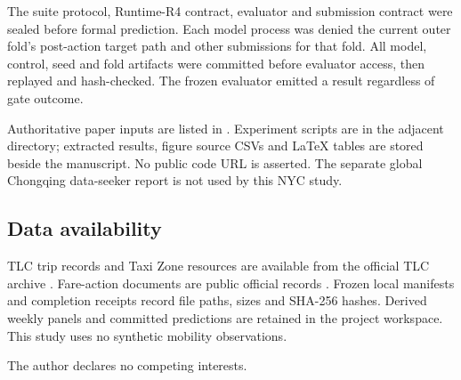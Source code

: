 \documentclass{nature}
\begin{document}
\begin{methods}
The suite protocol, Runtime-R4 contract, evaluator and submission contract were sealed before formal prediction. Each model process was denied the current outer fold's post-action target path and other submissions for that fold. All model, control, seed and fold artifacts were committed before evaluator access, then replayed and hash-checked. The frozen evaluator emitted a result regardless of gate outcome.

Authoritative paper inputs are listed in . Experiment scripts are in the adjacent  directory; extracted results, figure source CSVs and LaTeX tables are stored beside the manuscript. No public code URL is asserted. The separate global Chongqing data-seeker report is not used by this NYC study.

\subsection{Data availability}

TLC trip records and Taxi Zone resources are available from the official TLC archive \cite{tlctripdata}. Fare-action documents are public official records \cite{nys2019surcharge,tlc2022fare,mta2025crz}. Frozen local manifests and completion receipts record file paths, sizes and SHA-256 hashes. Derived weekly panels and committed predictions are retained in the project workspace. This study uses no synthetic mobility observations.

\end{methods}

\begin{addendum}
\item[Competing interests] The author declares no competing interests.
\end{addendum}



\end{document}
